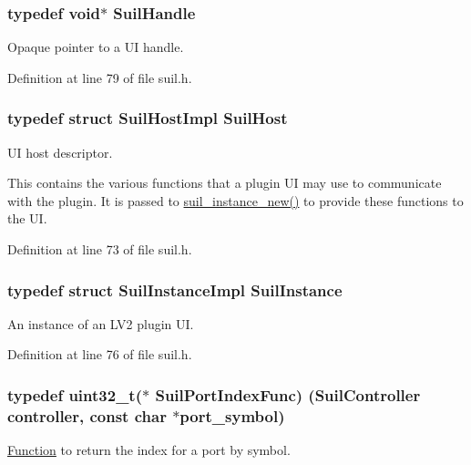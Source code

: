 \subsubsection[{\texorpdfstring{Suil\+Handle}{SuilHandle}}]{\setlength{\rightskip}{0pt plus 5cm}typedef {\bf void}$\ast$ {\bf Suil\+Handle}}\hypertarget{group__suil_gac9633f3ec108da4fb7ad0b64796f66fa}{}\label{group__suil_gac9633f3ec108da4fb7ad0b64796f66fa}
Opaque pointer to a UI handle. 

Definition at line 79 of file suil.\+h.

\subsubsection[{\texorpdfstring{Suil\+Host}{SuilHost}}]{\setlength{\rightskip}{0pt plus 5cm}typedef struct {\bf Suil\+Host\+Impl} {\bf Suil\+Host}}\hypertarget{group__suil_gac10e100afa94a434461386b79528c00c}{}\label{group__suil_gac10e100afa94a434461386b79528c00c}
UI host descriptor.

This contains the various functions that a plugin UI may use to communicate with the plugin. It is passed to \hyperlink{group__suil_gaa1efdd8087ff0d275e2d75b6980d30a2}{suil\+\_\+instance\+\_\+new()} to provide these functions to the UI. 

Definition at line 73 of file suil.\+h.

\subsubsection[{\texorpdfstring{Suil\+Instance}{SuilInstance}}]{\setlength{\rightskip}{0pt plus 5cm}typedef struct {\bf Suil\+Instance\+Impl} {\bf Suil\+Instance}}\hypertarget{group__suil_ga767e978a8c5f7c0d5246da79c9b97c6b}{}\label{group__suil_ga767e978a8c5f7c0d5246da79c9b97c6b}
An instance of an L\+V2 plugin UI. 

Definition at line 76 of file suil.\+h.

\subsubsection[{\texorpdfstring{Suil\+Port\+Index\+Func}{SuilPortIndexFunc}}]{\setlength{\rightskip}{0pt plus 5cm}typedef {\bf uint32\+\_\+t}($\ast$ Suil\+Port\+Index\+Func) ({\bf Suil\+Controller} controller, {\bf const} char $\ast$port\+\_\+symbol)}\hypertarget{group__suil_ga94e7dc09d4747a1d40f69ff4bef1e242}{}\label{group__suil_ga94e7dc09d4747a1d40f69ff4bef1e242}
\hyperlink{class_function}{Function} to return the index for a port by symbol. 

